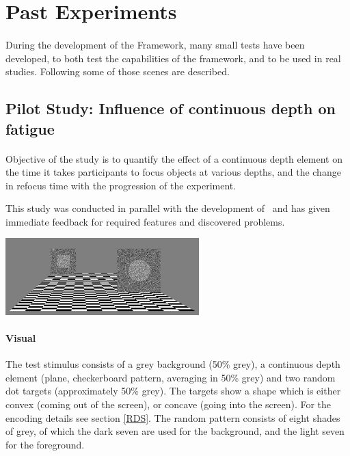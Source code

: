 \section{Past Experiments}
\paragraph{}
During the development of the Framework, many small tests have been developed, to both test the capabilities of the framework, and to be used in real studies.
Following some of those scenes are described.

\subsection[Influence of continuous depth]{Pilot Study: Influence of continuous depth on fatigue\label{FatiguePilot}}
\paragraph{}
Objective of the study is to quantify the effect of a continuous depth element on the time it takes participants to focus objects at various depths, and the change in refocus time with the progression of the experiment.

This study was conducted in parallel with the development of \ER\ and has given immediate feedback for required features and discovered problems.


\begin{center}
\includegraphics[width=7.5cm]{media/pilotFatigue.png}
\end{center}

\paragraph{Visual}
The test stimulus consists of a grey background (50\% grey), a continuous depth element (plane, checkerboard pattern, averaging in 50\% grey) and two random dot targets (approximately 50\% grey).
The targets show a shape which is either convex (coming out of the screen), or concave (going into the screen).
For the encoding details see section \ref{RDS}. The random pattern consists of eight shades of grey, of which the dark seven are used for the background, and the light seven for the foreground.

